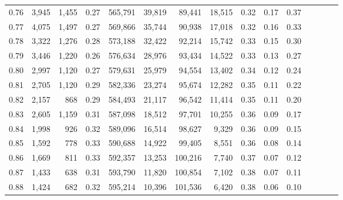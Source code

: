 \begin{tabular}{rrrcrrrrrrrrrrr}
0.76 &   3,945 &  1,455 &                                       0.27 &  565,791 &   39,819 &   89,441 &   18,515 &  0.32 &  0.17 &                         0.37 \\
0.77 &   4,075 &  1,497 &                                       0.27 &  569,866 &   35,744 &   90,938 &   17,018 &  0.32 &  0.16 &                         0.33 \\
0.78 &   3,322 &  1,276 &                                       0.28 &  573,188 &   32,422 &   92,214 &   15,742 &  0.33 &  0.15 &                         0.30 \\
0.79 &   3,446 &  1,220 &                                       0.26 &  576,634 &   28,976 &   93,434 &   14,522 &  0.33 &  0.13 &                         0.27 \\
0.80 &   2,997 &  1,120 &                                       0.27 &  579,631 &   25,979 &   94,554 &   13,402 &  0.34 &  0.12 &                         0.24 \\
0.81 &   2,705 &  1,120 &                                       0.29 &  582,336 &   23,274 &   95,674 &   12,282 &  0.35 &  0.11 &                         0.22 \\
0.82 &   2,157 &    868 &                                       0.29 &  584,493 &   21,117 &   96,542 &   11,414 &  0.35 &  0.11 &                         0.20 \\
0.83 &   2,605 &  1,159 &                                       0.31 &  587,098 &   18,512 &   97,701 &   10,255 &  0.36 &  0.09 &                         0.17 \\
0.84 &   1,998 &    926 &                                       0.32 &  589,096 &   16,514 &   98,627 &    9,329 &  0.36 &  0.09 &                         0.15 \\
0.85 &   1,592 &    778 &                                       0.33 &  590,688 &   14,922 &   99,405 &    8,551 &  0.36 &  0.08 &                         0.14 \\
0.86 &   1,669 &    811 &                                       0.33 &  592,357 &   13,253 &  100,216 &    7,740 &  0.37 &  0.07 &                         0.12 \\
0.87 &   1,433 &    638 &                                       0.31 &  593,790 &   11,820 &  100,854 &    7,102 &  0.38 &  0.07 &                         0.11 \\
0.88 &   1,424 &    682 &                                       0.32 &  595,214 &   10,396 &  101,536 &    6,420 &  0.38 &  0.06 &                         0.10 \\

\end{tabular}
